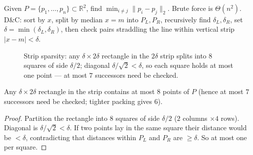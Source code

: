 Given $P=\{p_1,\dots,p_n\}\subset\mathbb{R}^2$, find $\min_{i\ne j}\|p_i-p_j\|_2$. Brute force is $\Theta(n^2)$. D\&C: sort by $x$, split by median $x=m$ into $P_L,P_R$, recursively find $\delta_L,\delta_R$, set $\delta=\min(\delta_L,\delta_R)$, then check pairs straddling the line within vertical strip $|x-m|<\delta$.

\begin{figure}[h!]
\centering
{}
\caption{Strip sparsity: any $\delta\times2\delta$ rectangle in the $2\delta$ strip splits into $8$ squares of side $\delta/2$; diagonal $\delta/\sqrt2<\delta$, so each square holds at most one point --- at most $7$ successors need be checked.}
\label{fig:strip}
\end{figure}

\begin{lemma}
Any $\delta\times2\delta$ rectangle in the strip contains at most $8$ points of $P$ (hence at most $7$ successors need be checked; tighter packing gives $6$).
\end{lemma}
\begin{proof}
Partition the rectangle into $8$ squares of side $\delta/2$ ($2$ columns $\times 4$ rows). Diagonal is $\delta/\sqrt2<\delta$. If two points lay in the same square their distance would be $<\delta$, contradicting that distances within $P_L$ and $P_R$ are $\ge\delta$. So at most one per square.
\end{proof}

